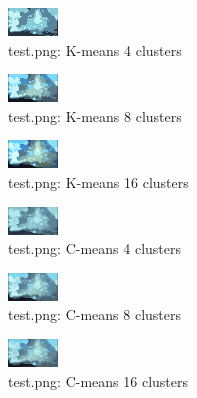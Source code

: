 \documentclass{article}
\begin{document}
  \begin{figure}[h]
    \centering
    \includegraphics[scale=6]{images/result_test_k_4.png}
    \caption{test.png: K-means 4 clusters}
    \label{fig:}
  \end{figure}

  \begin{figure}[h]
    \centering
    \includegraphics[scale=6]{images/result_test_k_8.png}
    \caption{test.png: K-means 8 clusters}
    \label{fig:}
  \end{figure}

  \begin{figure}[h]
    \centering
    \includegraphics[scale=6]{images/result_test_k_16.png}
    \caption{test.png: K-means 16 clusters}
    \label{fig:}
  \end{figure}

  \begin{figure}[h]
    \centering
    \includegraphics[scale=6]{images/result_test_c_4.png}
    \caption{test.png: C-means 4 clusters}
    \label{fig:}
  \end{figure}

  \begin{figure}[h]
    \centering
    \includegraphics[scale=6]{images/result_test_c_8.png}
    \caption{test.png: C-means 8 clusters}
    \label{fig:}
  \end{figure}

  \begin{figure}[h]
    \centering
    \includegraphics[scale=6]{images/result_test_c_16.png}
    \caption{test.png: C-means 16 clusters}
    \label{fig:}
  \end{figure}
\end{document}
